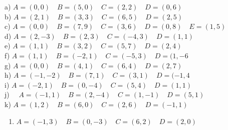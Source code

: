 \documentclass[10pt]{article}
\begin{document}
a) \(A=(0,0) \quad B=(5,0) \quad C=(2,2) \quad D=(0,6)\)\\
b) \(A=(2,1) \quad B=(3,3) \quad C=(6,5) \quad D=(2,5)\)\\
c) \(A=(0,0) \quad B=(7,9) \quad C=(3,6) \quad D=(0,8) \quad E=(1,5)\)\\
d) \(A=(2,-3) \quad B=(2,3) \quad C=(-4,3) \quad D=(1,1)\)\\
e) \(A=(1,1) \quad B=(3,2) \quad C=(5,7) \quad D=(2,4)\)\\
f) \(A=(1,1) \quad B=(-2,1) \quad C=(-5,3) \quad D=(1,-6\)\\
g) \(A=(0,0) \quad B=(4,1) \quad C=(6,4) \quad D=(2,7)\)\\
h) \(A=(-1,-2) \quad B=(7,1) \quad C=(3,1) \quad D=(-1,4\)\\
i) \(A=(-2,1) \quad B=(0,-4) \quad C=(5,4) \quad D=(1,1)\)\\
j) \(\quad A=(-1,1) \quad B=(2,-4) \quad C=(1,-1) \quad D=(5,1)\)\\
k) \(A=(1,2) \quad B=(6,0) \quad C=(2,6) \quad D=(-1,1)\)

\begin{enumerate}
  \item \(A=(-1,3) \quad B=(0,-3) \quad C=(6,2) \quad D=(2,0)\)
\end{enumerate}
\end{document}
